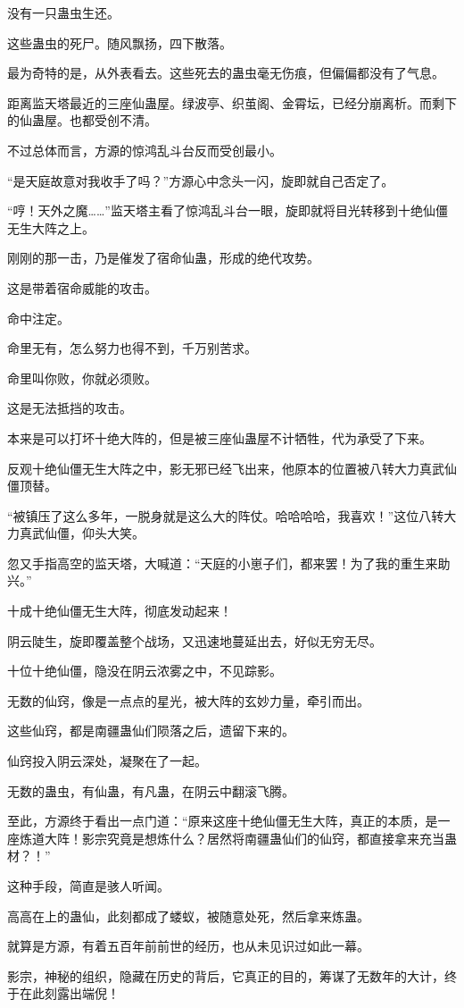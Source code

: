 \begin{this_body}
没有一只蛊虫生还。

这些蛊虫的死尸。随风飘扬，四下散落。

最为奇特的是，从外表看去。这些死去的蛊虫毫无伤痕，但偏偏都没有了气息。

距离监天塔最近的三座仙蛊屋。绿波亭、织茧阁、金霄坛，已经分崩离析。而剩下的仙蛊屋。也都受创不清。

不过总体而言，方源的惊鸿乱斗台反而受创最小。

“是天庭故意对我收手了吗？”方源心中念头一闪，旋即就自己否定了。

“哼！天外之魔……”监天塔主看了惊鸿乱斗台一眼，旋即就将目光转移到十绝仙僵无生大阵之上。

刚刚的那一击，乃是催发了宿命仙蛊，形成的绝代攻势。

这是带着宿命威能的攻击。

命中注定。

命里无有，怎么努力也得不到，千万别苦求。

命里叫你败，你就必须败。

这是无法抵挡的攻击。

本来是可以打坏十绝大阵的，但是被三座仙蛊屋不计牺牲，代为承受了下来。

反观十绝仙僵无生大阵之中，影无邪已经飞出来，他原本的位置被八转大力真武仙僵顶替。

“被镇压了这么多年，一脱身就是这么大的阵仗。哈哈哈哈，我喜欢！”这位八转大力真武仙僵，仰头大笑。

忽又手指高空的监天塔，大喊道：“天庭的小崽子们，都来罢！为了我的重生来助兴。”

十成十绝仙僵无生大阵，彻底发动起来！

阴云陡生，旋即覆盖整个战场，又迅速地蔓延出去，好似无穷无尽。

十位十绝仙僵，隐没在阴云浓雾之中，不见踪影。

无数的仙窍，像是一点点的星光，被大阵的玄妙力量，牵引而出。

这些仙窍，都是南疆蛊仙们陨落之后，遗留下来的。

仙窍投入阴云深处，凝聚在了一起。

无数的蛊虫，有仙蛊，有凡蛊，在阴云中翻滚飞腾。

至此，方源终于看出一点门道：“原来这座十绝仙僵无生大阵，真正的本质，是一座炼道大阵！影宗究竟是想炼什么？居然将南疆蛊仙们的仙窍，都直接拿来充当蛊材？！”

这种手段，简直是骇人听闻。

高高在上的蛊仙，此刻都成了蝼蚁，被随意处死，然后拿来炼蛊。

就算是方源，有着五百年前前世的经历，也从未见识过如此一幕。

影宗，神秘的组织，隐藏在历史的背后，它真正的目的，筹谋了无数年的大计，终于在此刻露出端倪！

\end{this_body}

